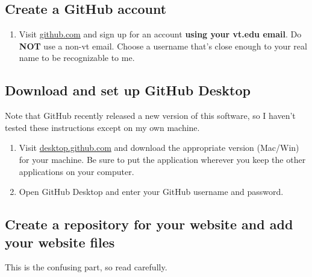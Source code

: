 \documentclass[]{book}
\providecommand{\tightlist}{%
  \setlength{\itemsep}{0pt}\setlength{\parskip}{0pt}}
\theoremstyle{definition}
\theoremstyle{definition}
\theoremstyle{definition}
\theoremstyle{remark}
\begin{document}
\hypertarget{create-a-github-account}{%
\subsection{Create a GitHub account}\label{create-a-github-account}}

\begin{enumerate}
\def\labelenumi{\arabic{enumi}.}
\tightlist
\item
  Visit \href{https://github.com}{github.com} and sign up for an account
  \textbf{using your vt.edu email}. Do \textbf{NOT} use a non-vt email.
  Choose a username that's close enough to your real name to be
  recognizable to me.
\end{enumerate}

\hypertarget{download-and-set-up-github-desktop}{%
\subsection{Download and set up GitHub
Desktop}\label{download-and-set-up-github-desktop}}

Note that GitHub recently released a new version of this software, so I
haven't tested these instructions except on my own machine.

\begin{enumerate}
\def\labelenumi{\arabic{enumi}.}
\tightlist
\item
  Visit \href{https://desktop.github.com/}{desktop.github.com} and
  download the appropriate version (Mac/Win) for your machine. Be sure
  to put the application wherever you keep the other applications on
  your computer.
\item
  Open GitHub Desktop and enter your GitHub username and password.
\end{enumerate}

\hypertarget{create-a-repository-for-your-website-and-add-your-website-files}{%
\subsection{Create a repository for your website and add your website
files}\label{create-a-repository-for-your-website-and-add-your-website-files}}

This is the confusing part, so read carefully.
\end{document}
